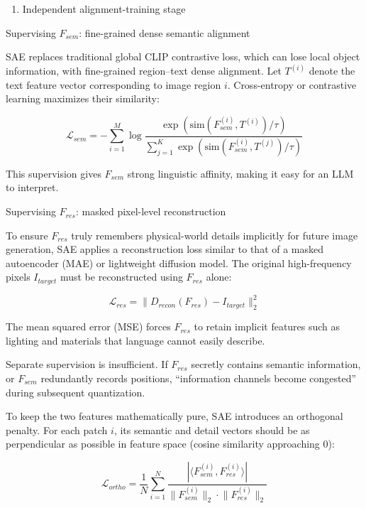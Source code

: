 \begin{enumerate}
\def\labelenumi{(\arabic{enumi})}
\tightlist
\item
  Independent alignment-training stage
\end{enumerate}

Supervising \(F_{sem}\): fine-grained dense semantic alignment

SAE replaces traditional global CLIP contrastive loss, which can lose local object information, with fine-grained region--text dense alignment. Let \(T^{(i)}\) denote the text feature vector corresponding to image region \(i\). Cross-entropy or contrastive learning maximizes their similarity:

\[
\mathcal{L}_{sem}=-\sum_{i=1}^{M}\log
\frac{\exp(\mathrm{sim}(F_{sem}^{(i)},T^{(i)})/\tau)}
{\sum_{j=1}^{K}\exp(\mathrm{sim}(F_{sem}^{(i)},T^{(j)})/\tau)}
\]

This supervision gives \(F_{sem}\) strong linguistic affinity, making it easy for an LLM to interpret.

Supervising \(F_{res}\): masked pixel-level reconstruction

To ensure \(F_{res}\) truly remembers physical-world details implicitly for future image generation, SAE applies a reconstruction loss similar to that of a masked autoencoder (MAE) or lightweight diffusion model. The original high-frequency pixels \(I_{target}\) must be reconstructed using \(F_{res}\) alone:

\[
\mathcal{L}_{res}=\lVert D_{recon}(F_{res})-I_{target}\rVert_2^2
\]

The mean squared error (MSE) forces \(F_{res}\) to retain implicit features such as lighting and materials that language cannot easily describe.

Separate supervision is insufficient. If \(F_{res}\) secretly contains semantic information, or \(F_{sem}\) redundantly records positions, ``information channels become congested'' during subsequent quantization.

To keep the two features mathematically pure, SAE introduces an orthogonal penalty. For each patch \(i\), its semantic and detail vectors should be as perpendicular as possible in feature space (cosine similarity approaching 0):

\[
\mathcal{L}_{ortho}=\frac{1}{N}\sum_{i=1}^{N}
\frac{|\langle F_{sem}^{(i)},F_{res}^{(i)}\rangle|}
{\lVert F_{sem}^{(i)}\rVert_2\cdot \lVert F_{res}^{(i)}\rVert_2}
\]

